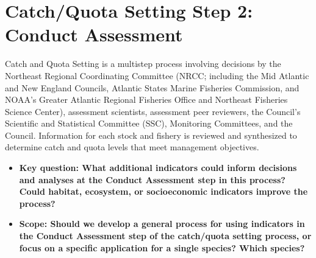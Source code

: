 \documentclass[
]{article}
\author{}
\date{\vspace{-2.5em}}
\providecommand{\tightlist}{%
  \setlength{\itemsep}{0pt}\setlength{\parskip}{0pt}}
\begin{document}
\vspace{-1cm}

\section{Catch/Quota Setting Step 2: Conduct
Assessment}\label{catchquota-setting-step-2-conduct-assessment}

\begin{noteblock}
Catch and Quota Setting is a multistep process involving decisions by
the Northeast Regional Coordinating Committee (NRCC; including the Mid
Atlantic and New England Councils, Atlantic States Marine Fisheries
Commission, and NOAA's Greater Atlantic Regional Fisheries Office and
Northeast Fisheries Science Center), assessment scientists, assessment
peer reviewers, the Council's Scientific and Statistical Committee
(SSC), Monitoring Committees, and the Council. Information for each
stock and fishery is reviewed and synthesized to determine catch and
quota levels that meet management objectives.

\end{noteblock}

\begin{itemize}
\tightlist
\item
  \textbf{Key question: What additional indicators could inform
  decisions and analyses at the Conduct Assessment step in this process?
  Could habitat, ecosystem, or socioeconomic indicators improve the
  process?}
\item
  \textbf{Scope: Should we develop a general process for using
  indicators in the Conduct Assessment step of the catch/quota setting
  process, or focus on a specific application for a single species?
  Which species?}
\end{itemize}
\end{document}
